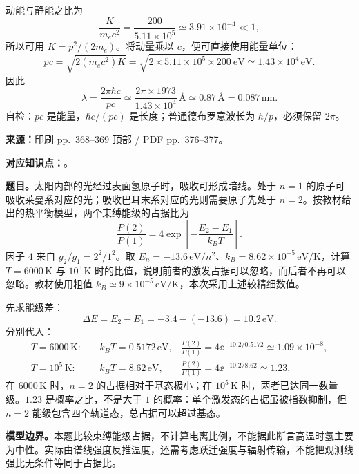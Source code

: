 \begin{checkedsolution}
动能与静能之比为
\begin{equation}
  \frac{K}{m_ec^2}=\frac{200}{5.11\times10^5}
    \simeq3.91\times10^{-4}\ll1,
\end{equation}
所以可用 $K=p^2/(2m_e)$。将动量乘以 $c$，便可直接使用能量单位：
\begin{equation}
  pc=\sqrt{2(m_ec^2)K}
    =\sqrt{2\times5.11\times10^5\times200}\,\mathrm{eV}
    \simeq1.43\times10^4\,\mathrm{eV}.
\end{equation}
因此
\begin{equation}
  \boxed{\lambda=\frac{2\pi\hbar c}{pc}
    \simeq\frac{2\pi\times1973}{1.43\times10^4}\,\text{\AA}
    \simeq0.87\,\text{\AA}=0.087\,\mathrm{nm}.}
\end{equation}
自检：$pc$ 是能量，$\hbar c/(pc)$ 是长度；普通德布罗意波长为 $h/p$，必须保留 $2\pi$。
\end{checkedsolution}

\textbf{来源：}印刷 pp.~368--369 顶部 / PDF pp.~376--377。

\textbf{对应知识点：}。

\textbf{题目。}太阳内部的光经过表面氢原子时，吸收可形成暗线。处于 $n=1$ 的原子可吸收莱曼系对应的光；吸收巴耳末系对应的光则需要原子先处于 $n=2$。按教材给出的热平衡模型，两个束缚能级的占据比为
\begin{equation}
  \frac{P(2)}{P(1)}=4\exp\left[-\frac{E_2-E_1}{k_BT}\right].
\end{equation}
因子 $4$ 来自 $g_2/g_1=2^2/1^2$。取 $E_n=-13.6\,\mathrm{eV}/n^2$、$k_B=8.62\times10^{-5}\,\mathrm{eV/K}$，计算 $T=6000\,\mathrm K$ 与 $10^5\,\mathrm K$ 时的比值，说明前者的激发占据可以忽略，而后者不再可以忽略。教材使用粗值 $k_B\simeq9\times10^{-5}\,\mathrm{eV/K}$，本次采用上述较精细数值。

\begin{checkedsolution}
先求能级差：
\begin{equation}
  \Delta E=E_2-E_1=-3.4-(-13.6)=10.2\,\mathrm{eV}.
\end{equation}
分别代入：
\begin{align}
  T=6000\,\mathrm K:&\quad k_BT=0.5172\,\mathrm{eV},
    &\frac{P(2)}{P(1)}=4\ee^{-10.2/0.5172}
      \simeq\boxed{1.09\times10^{-8}},\\
  T=10^5\,\mathrm K:&\quad k_BT=8.62\,\mathrm{eV},
    &\frac{P(2)}{P(1)}=4\ee^{-10.2/8.62}
      \simeq\boxed{1.23}.
\end{align}
在 $6000\,\mathrm K$ 时，$n=2$ 的占据相对于基态极小；在 $10^5\,\mathrm K$ 时，两者已达同一数量级。$1.23$ 是概率之比，不是大于 $1$ 的概率：单个激发态的占据虽被指数抑制，但 $n=2$ 能级包含四个轨道态，总占据可以超过基态。

\textbf{模型边界。}本题比较束缚能级占据，不计算电离比例，不能据此断言高温时氢主要为中性。实际由谱线强度反推温度，还需考虑跃迁强度与辐射传输，不能把观测线强比无条件等同于占据比。
\end{checkedsolution}

